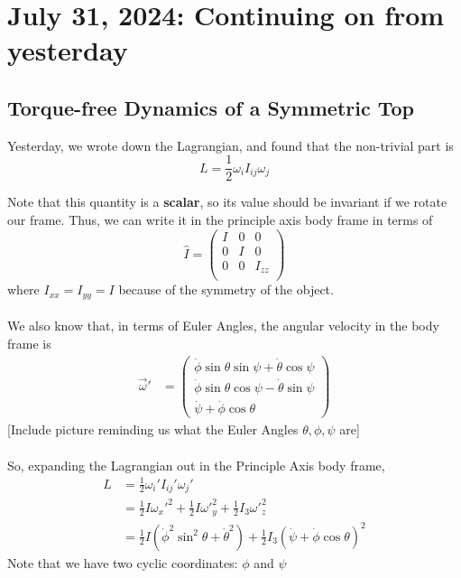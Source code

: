 \documentclass[11pt]{article}
\begin{document}
\pagebreak
\section{July 31, 2024: Continuing on from yesterday}

\subsection{Torque-free Dynamics of a Symmetric Top}

Yesterday, we wrote down the Lagrangian, and found that the non-trivial part is
\[ L = \frac{1}{2} \omega_i I_{ij} \omega_{j} \]

Note that this quantity is a \textbf{scalar}, so its value should be invariant if we rotate our frame. Thus, we can write it in the principle axis body frame in terms of 
\[ \hat{I} = \begin{pmatrix}
  I & 0 & 0 \\
  0 & I & 0 \\
  0 & 0 & I_{zz} \\
\end{pmatrix}  \]
where $I_{xx} = I_{yy} = I$ because of the symmetry of the object.
\\
\\
We also know that, in terms of Euler Angles, the angular velocity in the body frame is 
\begin{align*}
  \vec{\omega}' &= \begin{pmatrix}
    \dot{\phi} \sin\theta\sin\psi + \dot{\theta}\cos\psi \\
    \dot{\phi} \sin\theta\cos\psi - \dot{\theta}\sin\psi \\
    \dot{\psi} + \dot{\phi} \cos\theta
  \end{pmatrix}
\end{align*}
[Include picture reminding us what the Euler Angles $\theta, \phi, \psi$ are]
\\
\\
So, expanding the Lagrangian out in the Principle Axis body frame,
\begin{align*}
  L &= \frac{1}{2} \omega_{i}' I_{ij}' \omega_j' \\
  &= \frac{1}{2} I {\omega_x'}^2 + \frac{1}{2} I {\omega'}_{y}^2 + \frac{1}{2} I_3 {\omega'}_z^2 \\
  &= \frac{1}{2} I \left( \dot{\phi}^2 \sin^2\theta + \dot{\theta}^2 \right) + \frac{1}{2} I_3 \left( \dot{\psi} + \dot{\phi} \cos\theta \right)^2
\end{align*}
Note that we have two cyclic coordinates: $\phi$ and $\psi$
\end{document}
